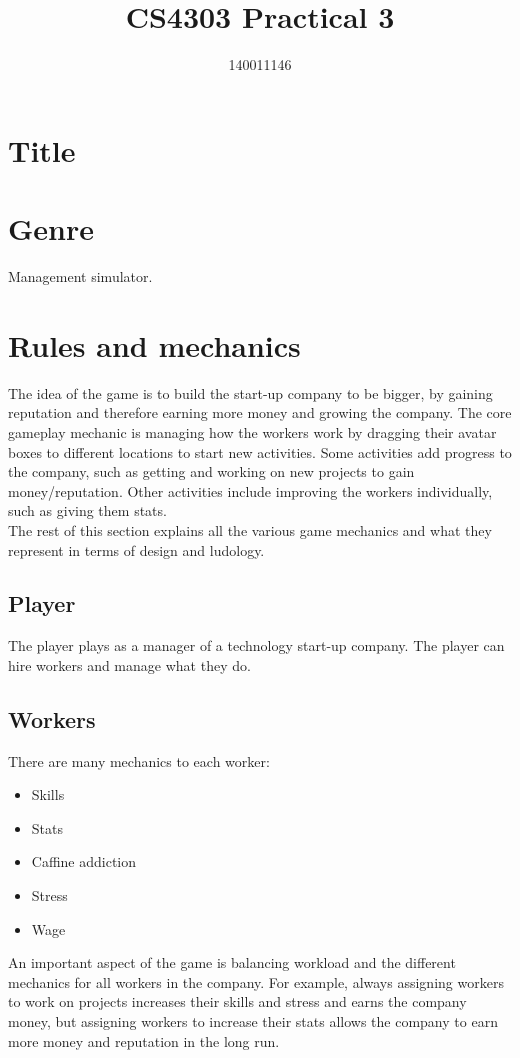 \documentclass[11pt]{article}
\author{140011146}
\title{CS4303 Practical 3}
\newcommand{\n}[0]{\\[\baselineskip]}
\begin{document}
\maketitle



\section{Title}

\section{Genre}
Management simulator.


\section{Rules and mechanics}
The idea of the game is to build the start-up company to be bigger, by gaining reputation and therefore earning more money and growing the company. The core gameplay mechanic is managing how the workers work by dragging their avatar boxes to different locations to start new activities. Some activities add progress to the company, such as getting and working on new projects to gain money/reputation. Other activities include improving the workers individually, such as giving them stats. 
\n
The rest of this section explains all the various game mechanics and what they represent in terms of design and ludology.
\subsection{Player}
The player plays as a manager of a technology start-up company. The player can hire workers and manage what they do.

\subsection{Workers}
There are many mechanics to each worker:
\begin{itemize}
\item Skills
\item Stats
\item Caffine addiction
\item Stress
\item Wage
\end{itemize}
An important aspect of the game is balancing workload and the different mechanics for all workers in the company. For example, always assigning workers to work on projects increases their skills and stress and earns the company money, but assigning workers to increase their stats allows the company to earn more money and reputation in the long run. 
\end{document}
